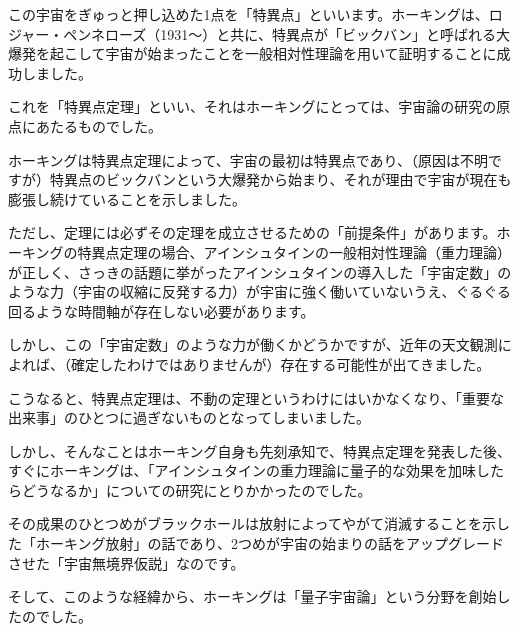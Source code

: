 \documentclass[10pt,b5paper,papersize,dvipdfmx]{jsbook}
\begin{document}
この宇宙をぎゅっと押し込めた1点を「特異点」といいます。ホーキングは、ロジャー・ペンネローズ（1931～）と共に、特異点が「ビックバン」と呼ばれる大爆発を起こして宇宙が始まったことを一般相対性理論を用いて証明することに成功しました。\par
これを「特異点定理」といい、それはホーキングにとっては、宇宙論の研究の原点にあたるものでした。\par
ホーキングは特異点定理によって、宇宙の最初は特異点であり、（原因は不明ですが）特異点のビックバンという大爆発から始まり、それが理由で宇宙が現在も膨張し続けていることを示しました。\par
ただし、定理には必ずその定理を成立させるための「前提条件」があります。ホーキングの特異点定理の場合、アインシュタインの一般相対性理論（重力理論）が正しく、さっきの話題に挙がったアインシュタインの導入した「宇宙定数」のような力（宇宙の収縮に反発する力）が宇宙に強く働いていないうえ、ぐるぐる回るような時間軸が存在しない必要があります。\par
しかし、この「宇宙定数」のような力が働くかどうかですが、近年の天文観測によれば、（確定したわけではありませんが）存在する可能性が出てきました。\par
こうなると、特異点定理は、不動の定理というわけにはいかなくなり、「重要な出来事」のひとつに過ぎないものとなってしまいました。\par
しかし、そんなことはホーキング自身も先刻承知で、特異点定理を発表した後、すぐにホーキングは、「アインシュタインの重力理論に量子的な効果を加味したらどうなるか」についての研究にとりかかったのでした。\par
その成果のひとつめがブラックホールは放射によってやがて消滅することを示した「ホーキング放射」の話であり、2つめが宇宙の始まりの話をアップグレードさせた「宇宙無境界仮説」なのです。\par
そして、このような経緯から、ホーキングは「量子宇宙論」という分野を創始したのでした。\par
\end{document}
